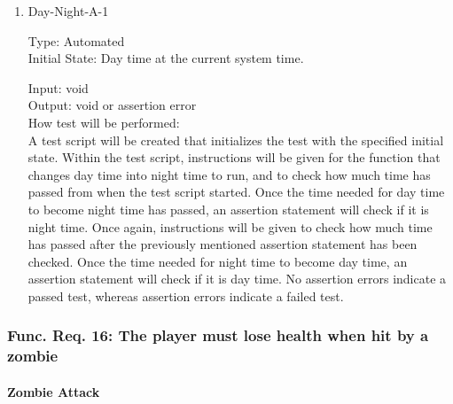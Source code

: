 \documentclass[12pt, titlepage]{article}
\begin{document}
\begin{enumerate}

\item{Day-Night-A-1\\}

Type: Automated \\
					
Initial State: Day time at the current system time.
					
Input: void\\
					
Output: void or assertion error\\
					
How test will be performed:\\ A test script will be created that initializes the test with the specified initial state. Within the test script, instructions will be given for the function that changes day time into night time to run, and to check how much time has passed from when the test script started. Once the time needed for day time to become night time has passed, an assertion statement will check if it is night time. Once again, instructions will be given to check how much time has passed after the previously mentioned assertion statement has been checked. Once the time needed for night time to become day time, an assertion statement will check if it is day time. No assertion errors indicate a passed test, whereas assertion errors indicate a failed test.\\

\end{enumerate}

\subsubsection{Func. Req. 16: The player must lose health when hit by a zombie}

\paragraph{Zombie Attack}
\end{document}
